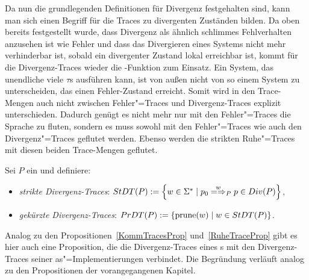 Da nun die grundlegenden Definitionen für Divergenz festgehalten sind, kann man
sich einen Begriff für die Traces zu divergenten Zuständen bilden. Da oben
bereits festgestellt wurde, dass Divergenz als ähnlich \glqq schlimmes
Fehlverhalten\grqq{} anzusehen ist wie Fehler und dass das Divergieren eines
Systems nicht mehr verhinderbar ist, sobald ein divergenter Zustand lokal
erreichbar ist, kommt für die Divergenz-Traces wieder die \prune{}-Funktion zum
Einsatz. Ein System, das unendliche viele $\tau$s ausführen kann, ist von außen
nicht von so einem System zu unterscheiden, das einen Fehler-Zustand erreicht.
Somit wird in den Trace-Mengen auch nicht zwischen Fehler"=Traces und
Divergenz-Traces explizit unterschieden. Dadurch genügt es nicht mehr nur mit
den Fehler"=Traces die Sprache zu fluten, sondern es muss sowohl mit den
Fehler"=Traces wie auch den Divergenz"=Traces geflutet werden. Ebenso werden
die strikten Ruhe"=Traces mit diesen beiden Trace-Mengen geflutet.

\begin{Def}
  Sei $P$ ein \MEIO{} und definiere:
  \begin{itemize}
    \item \emph{strikte Divergenz-Traces}: $\StDT (P) := \left\{w\in\Sigma
      ^*\mid p_0\weakmay[w]_P p\in Div(P)\right\}$,
    \item \emph{gekürzte Divergenz-Traces}: $PrDT (P) := \left\{\mathrm{prune} (w)\mid
      w\in StDT (P)\right\}$.
  \end{itemize}
\end{Def}

Analog zu den Propositionen~\ref{KommTracesProp} und~\ref{RuheTraceProp} gibt es
hier auch eine Proposition, die die Divergenz-Traces eines \MEIO{}s mit den
Divergenz-Traces seiner as"=Implementierungen verbindet. Die Begründung
verläuft analog zu den Propositionen der vorangegangenen Kapitel.

